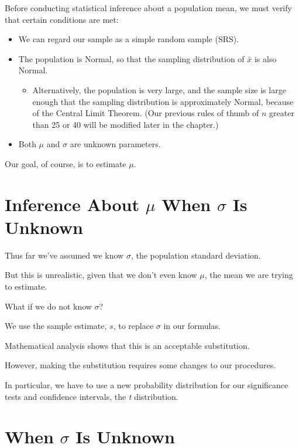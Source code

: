 \documentclass[
  letterpaper,
  DIV=11,
  numbers=noendperiod]{scrreprt}
\providecommand{\tightlist}{%
  \setlength{\itemsep}{0pt}\setlength{\parskip}{0pt}}
\begin{document}
Before conducting statistical inference about a population mean, we must
verify that certain conditions are met:

\begin{itemize}
\item
  We can regard our sample as a simple random sample (SRS).
\item
  The population is Normal, so that the sampling distribution of
  \(\bar{x}\) is also Normal.

  \begin{itemize}
  \tightlist
  \item
    Alternatively, the population is very large, and the sample size is
    large enough that the sampling distribution is approximately Normal,
    because of the Central Limit Theorem. (Our previous rules of thumb
    of \(n\) greater than 25 or 40 will be modified later in the
    chapter.)
  \end{itemize}
\item
  Both \(\mu\) and \(\sigma\) are unknown parameters.
\end{itemize}

Our goal, of course, is to estimate \(\mu\).

\section{\texorpdfstring{Inference About \(\mu\) When \(\sigma\) Is
Unknown}{Inference About \textbackslash mu When \textbackslash sigma Is Unknown}}\label{inference-about-mu-when-sigma-is-unknown}

Thus far we've assumed we know \(\sigma\), the population standard
deviation.

But this is unrealistic, given that we don't even know \(\mu\), the mean
we are trying to estimate.

What if we do not know \(\sigma\)?

We use the sample estimate, \(s\), to replace \(\sigma\) in our
formulas.

Mathematical analysis shows that this is an acceptable substitution.

However, making the substitution requires some changes to our
procedures.

In particular, we have to use a new probability distribution for our
significance tests and confidence intervals, the \emph{t} distribution.

\section{\texorpdfstring{When \(\sigma\) Is
Unknown}{When \textbackslash sigma Is Unknown}}\label{when-sigma-is-unknown}
\end{document}
